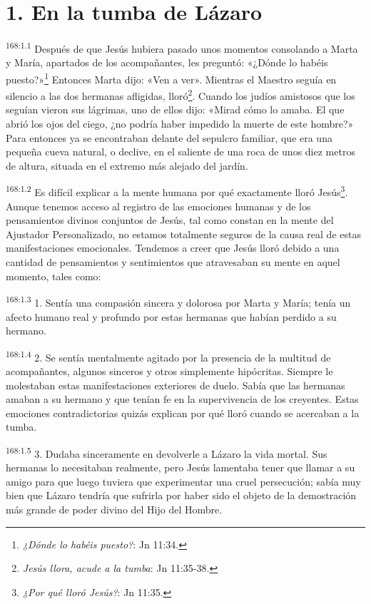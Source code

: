 \section*{1. En la tumba de Lázaro}
\par
\textsuperscript{168:1.1} Después de que Jesús hubiera pasado unos momentos consolando a Marta y María, apartados de los acompañantes, les preguntó: «¿Dónde lo habéis puesto?»\footnote{\textit{¿Dónde lo habéis puesto?}: Jn 11:34.} Entonces Marta dijo: «Ven a ver». Mientras el Maestro seguía en silencio a las dos hermanas afligidas, lloró\footnote{\textit{Jesús llora, acude a la tumba}: Jn 11:35-38.}. Cuando los judíos amistosos que los seguían vieron sus lágrimas, uno de ellos dijo: «Mirad cómo lo amaba. El que abrió los ojos del ciego, ¿no podría haber impedido la muerte de este hombre?» Para entonces ya se encontraban delante del sepulcro familiar, que era una pequeña cueva natural, o declive, en el saliente de una roca de unos diez metros de altura, situada en el extremo más alejado del jardín.

\par
\textsuperscript{168:1.2} Es difícil explicar a la mente humana por qué exactamente lloró Jesús\footnote{\textit{¿Por qué lloró Jesús?}: Jn 11:35.}. Aunque tenemos acceso al registro de las emociones humanas y de los pensamientos divinos conjuntos de Jesús, tal como constan en la mente del Ajustador Personalizado, no estamos totalmente seguros de la causa real de estas manifestaciones emocionales. Tendemos a creer que Jesús lloró debido a una cantidad de pensamientos y sentimientos que atravesaban su mente en aquel momento, tales como:

\par
\textsuperscript{168:1.3} 1. Sentía una compasión sincera y dolorosa por Marta y María; tenía un afecto humano real y profundo por estas hermanas que habían perdido a su hermano.

\par
\textsuperscript{168:1.4} 2. Se sentía mentalmente agitado por la presencia de la multitud de acompañantes, algunos sinceros y otros simplemente hipócritas. Siempre le molestaban estas manifestaciones exteriores de duelo. Sabía que las hermanas amaban a su hermano y que tenían fe en la supervivencia de los creyentes. Estas emociones contradictorias quizás explican por qué lloró cuando se acercaban a la tumba.

\par
\textsuperscript{168:1.5} 3. Dudaba sinceramente en devolverle a Lázaro la vida mortal. Sus hermanas lo necesitaban realmente, pero Jesús lamentaba tener que llamar a su amigo para que luego tuviera que experimentar una cruel persecución; sabía muy bien que Lázaro tendría que sufrirla por haber sido el objeto de la demostración más grande de poder divino del Hijo del Hombre.

